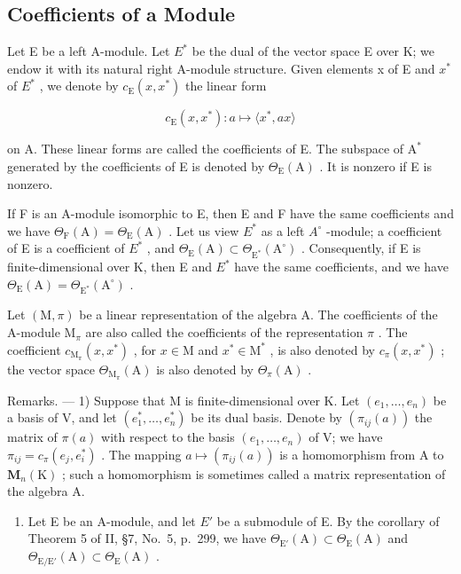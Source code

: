 \subsection{Coefficients of a Module}

Let E be a left A-module. Let \(E^{*}\) be the dual of the vector space E over K; we endow it with its natural right A-module structure. Given elements x of E and \(x^{*}\) of \(E^{*}\) , we denote by \(c_{\mathrm{E}}(x, x^{*})\) the linear form

\[
c _ {\mathrm{E}} (x, x ^ {*}): a \mapsto \langle x ^ {*}, a x \rangle\tag{5}
\]

on A. These linear forms are called the coefficients of E. The subspace of \(\mathrm{A}^*\) generated by the coefficients of E is denoted by \(\Theta_{\mathrm{E}}(\mathrm{A})\) . It is nonzero if E is nonzero.

If F is an A-module isomorphic to E, then E and F have the same coefficients and we have \(\Theta_{\mathrm{F}}(\mathrm{A}) = \Theta_{\mathrm{E}}(\mathrm{A})\) . Let us view \(E^{*}\) as a left \(A^{\circ}\) -module; a coefficient of E is a coefficient of \(E^{*}\) , and \(\Theta_{\mathrm{E}}(\mathrm{A}) \subset \Theta_{\mathrm{E}^{*}}(\mathrm{A}^{\circ})\) . Consequently, if E is finite-dimensional over K, then E and \(E^{*}\) have the same coefficients, and we have \(\Theta_{\mathrm{E}}(\mathrm{A}) = \Theta_{\mathrm{E}^{*}}(\mathrm{A}^{\circ})\) .

Let \((\mathrm{M},\pi)\) be a linear representation of the algebra A. The coefficients of the A-module \(\mathrm{M}_{\pi}\) are also called the coefficients of the representation \(\pi\) . The coefficient \(c_{\mathrm{M}_{\pi}}(x,x^{*})\) , for \(x\in \mathrm{M}\) and \(x^{*}\in \mathrm{M}^{*}\) , is also denoted by \(c_{\pi}(x,x^{*})\) ; the vector space \(\Theta_{\mathrm{M}_{\pi}}(\mathrm{A})\) is also denoted by \(\Theta_{\pi}(\mathrm{A})\) .

Remarks. --- 1) Suppose that M is finite-dimensional over K. Let \((e_1, \ldots, e_n)\) be a basis of V, and let \((e_1^*, \ldots, e_n^*)\) be its dual basis. Denote by \((\pi_{ij}(a))\) the matrix of \(\pi(a)\) with respect to the basis \((e_1, \ldots, e_n)\) of V; we have \(\pi_{ij} = c_\pi(e_j, e_i^*)\) . The mapping \(a \mapsto (\pi_{ij}(a))\) is a homomorphism from A to \(\mathbf{M}_n(\mathrm{K})\) ; such a homomorphism is sometimes called a matrix representation of the algebra A.

\begin{enumerate}
\def\labelenumi{\arabic{enumi})}
\setcounter{enumi}{1}
\tightlist
\item
  Let E be an A-module, and let \(E'\) be a submodule of E. By the corollary of Theorem 5 of II, §7, No.~5, p.~299, we have \(\Theta_{\mathrm{E}'}(\mathrm{A}) \subset \Theta_{\mathrm{E}}(\mathrm{A})\) and \(\Theta_{\mathrm{E}/\mathrm{E}'}(\mathrm{A}) \subset \Theta_{\mathrm{E}}(\mathrm{A})\) .
\end{enumerate}

